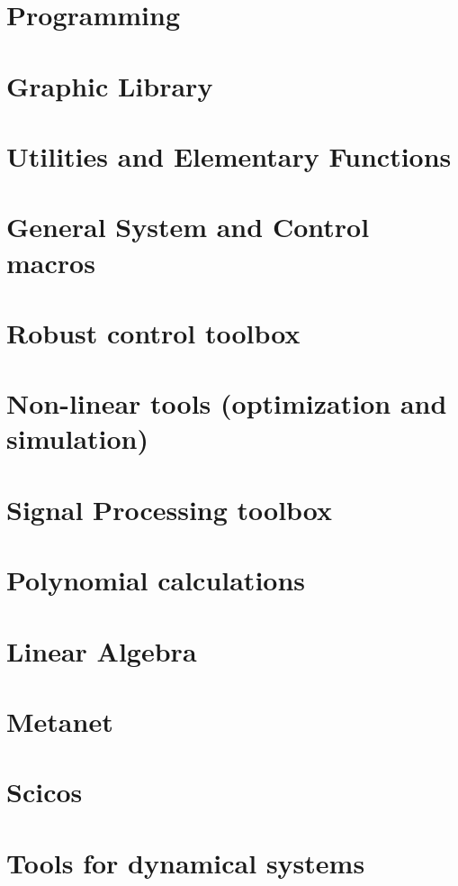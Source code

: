              \textheight=660pt 
             \textwidth=15cm
             \topmargin=-27pt 
             \oddsidemargin=0.7cm
             \evensidemargin=0.7cm
             \marginparwidth=60pt
\def\vector#1{\left( \begin{array}{c} #1  \end{array}\right)}
\def\matrixq#1{\left( \begin{array}{cc} #1  \end{array}\right)}

\makeindex 

%





\chapter{Programming}
         
\chapter{Graphic Library }
         
\chapter{Utilities and Elementary Functions}
         
\chapter{General System and Control macros}
         
\chapter{Robust control toolbox}
         
\chapter{Non-linear tools (optimization and simulation) }
         
\chapter{Signal Processing toolbox}
         
        
\chapter{Polynomial calculations}
        
\chapter{Linear Algebra}
        
\chapter{Metanet}
        
\chapter{Scicos} 
        
\chapter{Tools for dynamical systems}
        


\printindex

